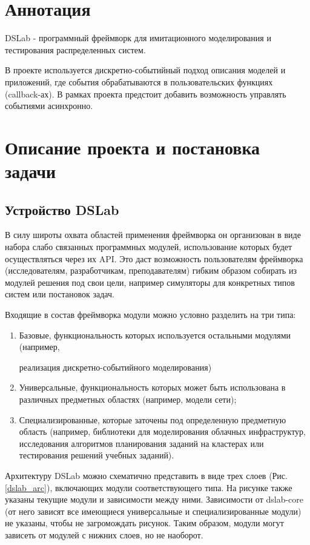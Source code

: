 
\section*{Аннотация}

DSLab - программный фреймворк для имитационного моделирования и тестирования распределенных систем.

В проекте используется дискретно-событийный подход описания моделей и приложений, где события обрабатываются в пользовательских функциях (callback-ах). В рамках проекта предстоит добавить возможность управлять событиями асинхронно.


\section{Описание проекта и постановка задачи}

\subsection{Устройство DSLab}

В силу широты охвата областей применения фреймворка он организован в виде набора слабо связанных программных модулей, использование которых будет осуществляться через их API. Это даст возможность пользователям фреймворка (исследователям, разработчикам, преподавателям) гибким образом собирать из модулей решения под свои цели, например симуляторы для конкретных типов систем или постановок задач.

Входящие в состав фреймворка модули можно условно разделить на три типа:
\begin{enumerate}
    \item 
    Базовые, функциональность которых используется остальными модулями (например, 
    
    реализация дискретно-событийного моделирования)
    \item
    Универсальные, функциональность которых может быть использована в различных предметных областях (например, модели сети);
    \item
    Специализированные, которые заточены под определенную предметную область (например, библиотеки для моделирования облачных инфраструктур, исследования алгоритмов планирования заданий на кластерах или тестирования решений учебных заданий).
\end{enumerate}

Архитектуру DSLab можно схематично представить в виде трех слоев (Рис. \ref{dslab_arc}), включающих модули соответствующего типа. На рисунке также указаны текущие модули и зависимости между ними. Зависимости от dslab-core (от него зависят все имеющиеся универсальные и специализированные модули) не указаны, чтобы не загромождать рисунок. Таким образом, модули могут зависеть от модулей с нижних слоев, но не наоборот.


